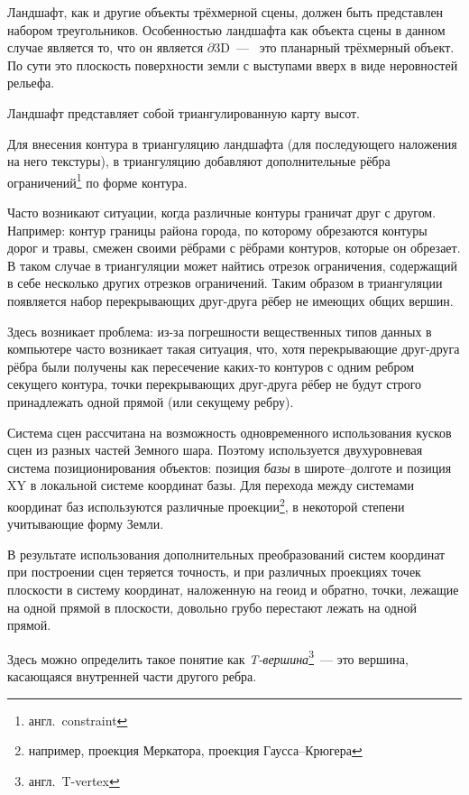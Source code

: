 \documentclass[a4paper,12pt,titlepage]{report}
\begin{document}
Ландшафт, как и другие объекты трёхмерной сцены, должен быть представлен набором треугольников.
Особенностью ландшафта как объекта сцены в данном случае является то, что он является $\partial 3\mathrm{D}$~---~
это планарный трёхмерный объект.
По сути это плоскость поверхности земли с выступами вверх в виде неровностей рельефа.

Ландшафт представляет собой триангулированную карту высот.

Для внесения контура в триангуляцию ландшафта (для последующего наложения на него текстуры),
в триангуляцию добавляют дополнительные рёбра ограничений\footnote{англ.~constraint} по форме контура.

Часто возникают ситуации, когда различные контуры граничат друг с другом.
Например: контур границы района города, по которому обрезаются контуры дорог и травы,
смежен своими рёбрами с рёбрами контуров, которые он обрезает.
В таком случае в триангуляции может найтись отрезок ограничения,
содержащий в себе несколько других отрезков ограничений.
Таким образом в триангуляции появляется набор перекрывающих друг-друга рёбер не имеющих общих вершин.

Здесь возникает проблема: из-за погрешности вещественных типов данных в компьютере
часто возникает такая ситуация, что, хотя перекрывающие друг-друга рёбра были получены как пересечение
каких-то контуров с одним ребром секущего контура, 
точки перекрывающих друг-друга рёбер не будут строго принадлежать одной прямой (или секущему ребру).

Система сцен рассчитана на возможность одновременного использования кусков сцен из разных частей Земного шара.
Поэтому используется двухуровневая система позиционирования объектов: 
позиция \textit{базы} в широте--долготе и позиция XY в локальной системе координат базы.
Для перехода между системами координат баз используются различные 
проекции\footnote{например, проекция Меркатора, проекция Гаусса--Крюгера}, 
в некоторой степени учитывающие форму Земли.

В результате использования дополнительных преобразований систем координат при построении сцен 
теряется точность, 
и при различных проекциях точек плоскости в систему координат, наложенную на геоид и обратно,
точки, лежащие на одной прямой в плоскости, довольно грубо перестают лежать на одной прямой.

Здесь можно определить такое понятие как \textit{T-вершина}\footnote{англ.~T-vertex}~--- 
это вершина, касающаяся внутренней части другого ребра.
\end{document}
